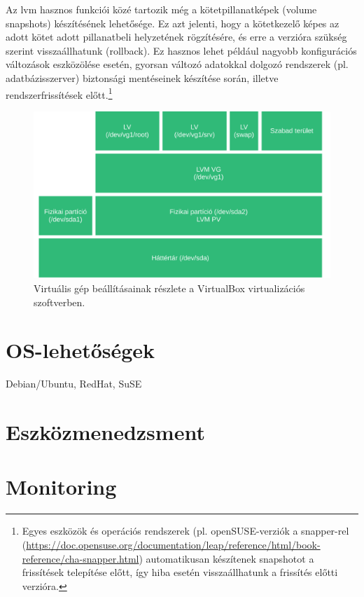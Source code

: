 Az \acrshort{lvm} hasznos funkciói közé tartozik még a kötetpillanatképek (volume snapshots) készítésének lehetősége. Ez azt jelenti, hogy a kötetkezelő képes az adott kötet adott pillanatbeli helyzetének rögzítésére, és erre a verzióra szükség szerint visszaállhatunk (rollback). Ez hasznos lehet például nagyobb konfigurációs változások eszközölése esetén, gyorsan változó adatokkal dolgozó rendszerek (pl. adatbázisszerver) biztonsági mentéseinek készítése során, illetve rendszerfrissítések előtt.\footnote{Egyes eszközök és operációs rendszerek (pl. openSUSE-verziók a snapper-rel (\url{https://doc.opensuse.org/documentation/leap/reference/html/book-reference/cha-snapper.html}) automatikusan készítenek snapshotot a frissítések telepítése előtt, így hiba esetén visszaállhatunk a frissítés előtti verzióra.}



\begin{figure}[!ht]
	\centering
	\includegraphics[width=14cm]{figures/lvm.pdf}
	\caption{Virtuális gép beállításainak részlete a VirtualBox virtualizációs szoftverben.}
	\label{fig:lvm}
\end{figure}

\section{OS-lehetőségek}
Debian/Ubuntu, RedHat, SuSE

\section{Eszközmenedzsment}

\section{Monitoring}